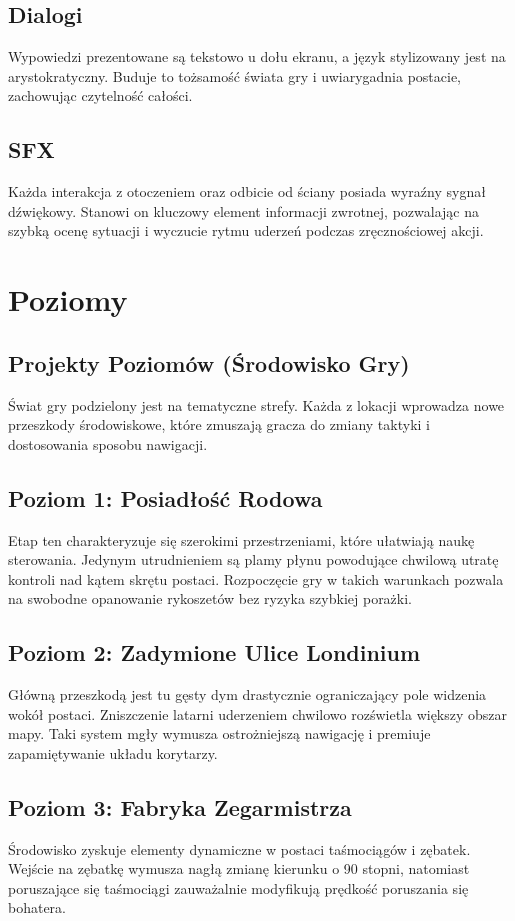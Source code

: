 \documentclass[12pt, letterpaper,Titlepage]{article}
\begin{document}
\subsection{Dialogi}
Wypowiedzi prezentowane są tekstowo u dołu ekranu, a język stylizowany jest na arystokratyczny. Buduje to tożsamość świata gry i uwiarygadnia postacie, zachowując czytelność całości.

\subsection{SFX}
Każda interakcja z otoczeniem oraz odbicie od ściany posiada wyraźny sygnał dźwiękowy. Stanowi on kluczowy element informacji zwrotnej, pozwalając na szybką ocenę sytuacji i wyczucie rytmu uderzeń podczas zręcznościowej akcji.

\section{Poziomy}
\subsection{Projekty Poziomów (Środowisko Gry)}
Świat gry podzielony jest na tematyczne strefy. Każda z lokacji wprowadza nowe przeszkody środowiskowe, które zmuszają gracza do zmiany taktyki i dostosowania sposobu nawigacji.

\subsection{Poziom 1: Posiadłość Rodowa} 
Etap ten charakteryzuje się szerokimi przestrzeniami, które ułatwiają naukę sterowania. Jedynym utrudnieniem są plamy płynu powodujące chwilową utratę kontroli nad kątem skrętu postaci. Rozpoczęcie gry w takich warunkach pozwala na swobodne opanowanie rykoszetów bez ryzyka szybkiej porażki.

\subsection{Poziom 2: Zadymione Ulice Londinium}
Główną przeszkodą jest tu gęsty dym drastycznie ograniczający pole widzenia wokół postaci. Zniszczenie latarni uderzeniem chwilowo rozświetla większy obszar mapy. Taki system mgły wymusza ostrożniejszą nawigację i premiuje zapamiętywanie układu korytarzy.

\subsection{Poziom 3: Fabryka Zegarmistrza}
Środowisko zyskuje elementy dynamiczne w postaci taśmociągów i zębatek. Wejście na zębatkę wymusza nagłą zmianę kierunku o 90 stopni, natomiast poruszające się taśmociągi zauważalnie modyfikują prędkość poruszania się bohatera.
\end{document}
